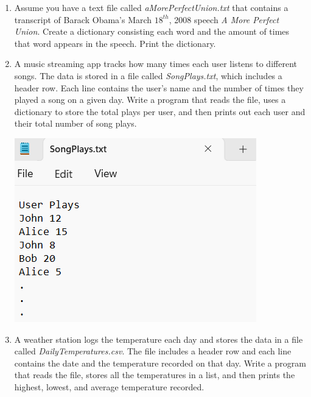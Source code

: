 \documentclass{article}
\begin{document}
\begin{enumerate}

	\item
		Assume you have a text file called \textit{aMorePerfectUnion.txt} that contains a transcript of Barack Obama's 
		March $18^{th}$, 2008 speech \textit{A More Perfect Union}. Create a dictionary consisting each word and the 
		amount of times that word appears in the speech. Print the dictionary.


	\item 
		A music streaming app tracks how many times each user listens to different songs.  
		The data is stored in a file called \textit{SongPlays.txt}, which includes a header row.  
		Each line contains the user’s name and the number of times they played a song on a given day.  
		Write a program that reads the file, uses a dictionary to store the total plays per user, 
		and then prints out each user and their total number of song plays.
		
		\begin{flushright}
			\includegraphics[scale=.65]{imgs/SongPlaysData.PNG}
		\end{flushright}



	\item 
		A weather station logs the temperature each day and stores the data in a file called \textit{DailyTemperatures.csv}.  
		The file includes a header row and each line contains the date and the temperature recorded on that day.  
		Write a program that reads the file, stores all the temperatures in a list, and then prints the highest, lowest, and average temperature recorded.
		

\end{enumerate}
\end{document}
